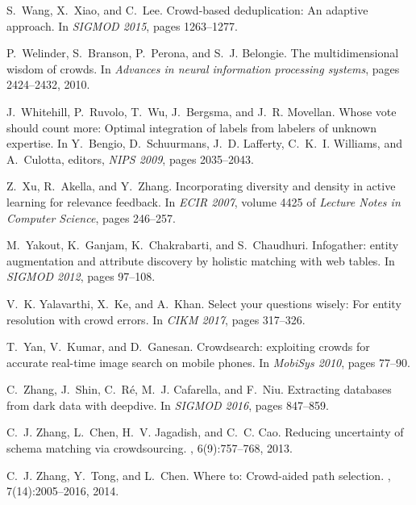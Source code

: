 \documentclass[11pt]{article}
\begin{document}
\begin{thebibliography}{10}
	S.~Wang, X.~Xiao, and C.~Lee.
	\newblock Crowd-based deduplication: An adaptive approach.
	\newblock In {\em {SIGMOD} 2015}, pages 1263--1277.
	
	P.~Welinder, S.~Branson, P.~Perona, and S.~J. Belongie.
	\newblock The multidimensional wisdom of crowds.
	\newblock In {\em Advances in neural information processing systems}, pages
	2424--2432, 2010.
	
	J.~Whitehill, P.~Ruvolo, T.~Wu, J.~Bergsma, and J.~R. Movellan.
	\newblock Whose vote should count more: Optimal integration of labels from
	labelers of unknown expertise.
	\newblock In Y.~Bengio, D.~Schuurmans, J.~D. Lafferty, C.~K.~I. Williams, and
	A.~Culotta, editors, {\em NIPS 2009}, pages 2035--2043.
	
	Z.~Xu, R.~Akella, and Y.~Zhang.
	\newblock Incorporating diversity and density in active learning for relevance
	feedback.
	\newblock In {\em {ECIR} 2007}, volume 4425 of {\em Lecture Notes in Computer
		Science}, pages 246--257.
	
	M.~Yakout, K.~Ganjam, K.~Chakrabarti, and S.~Chaudhuri.
	\newblock Infogather: entity augmentation and attribute discovery by holistic
	matching with web tables.
	\newblock In {\em {SIGMOD} 2012}, pages 97--108.
	
	V.~K. Yalavarthi, X.~Ke, and A.~Khan.
	\newblock Select your questions wisely: For entity resolution with crowd
	errors.
	\newblock In {\em {CIKM} 2017}, pages 317--326.
	
	T.~Yan, V.~Kumar, and D.~Ganesan.
	\newblock Crowdsearch: exploiting crowds for accurate real-time image search on
	mobile phones.
	\newblock In {\em MobiSys 2010}, pages 77--90.
	
	C.~Zhang, J.~Shin, C.~R{\'{e}}, M.~J. Cafarella, and F.~Niu.
	\newblock Extracting databases from dark data with deepdive.
	\newblock In {\em {SIGMOD} 2016}, pages 847--859.
	
	C.~J. Zhang, L.~Chen, H.~V. Jagadish, and C.~C. Cao.
	\newblock Reducing uncertainty of schema matching via crowdsourcing.
	, 6(9):757--768, 2013.
	
	C.~J. Zhang, Y.~Tong, and L.~Chen.
	\newblock Where to: Crowd-aided path selection.
	, 7(14):2005--2016, 2014.
	

\end{thebibliography}
\end{document}
